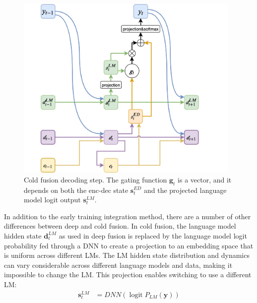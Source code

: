 \documentclass[11pt]{article}
\DeclareMathOperator*{\logit}{logit}
\begin{document}
\begin{figure}[htb]
    \begin{center}
        \includegraphics[height=9cm]{coldfusion.png}
    \end{center}
    \caption{Cold fusion decoding step. The gating function $\boldsymbol g_t$ is a vector, and it depends on both the enc-dec state $\boldsymbol{s}_t^{ED}$ and the projected language model logit output $\boldsymbol{s}_t^{LM}$.}
    \label{plot}
\end{figure}

In addition to the early training integration method, there are a number of other differences between deep and cold fusion.
In cold fusion, the language model hidden state $\boldsymbol{d}_t^{LM}$ as used in deep fusion is replaced by the language model logit probability fed through a DNN to create a projection to an embedding space that is uniform across different LMs.
The LM hidden state distribution and dynamics can vary considerable across different language models and data, making it impossible to change the LM. This projection enables switching to use a different LM:
\begin{align}
    \boldsymbol{s}_t^{LM} &= DNN(\logit P_{LM}(\boldsymbol{y}))
\end{align}

\end{document}
